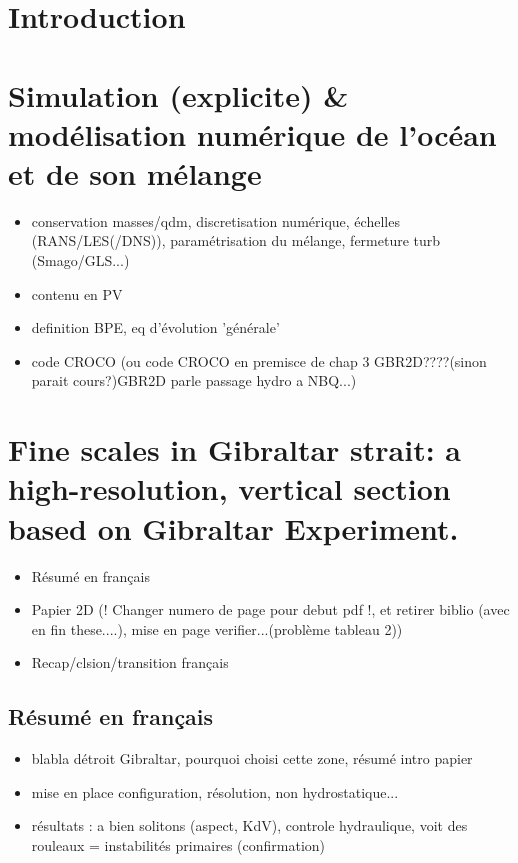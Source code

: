 \documentclass[a4paper,12pt,notitlepage,twoside]{report}
\numberwithin{equation}{section}
\begin{document}

\newpage
\chapter{Introduction}
\label{chapINTRO}
\citet{armi_1985}






\chapter{Simulation (explicite) \& modélisation numérique de l'oc\'ean et de son m\'elange}
\label{chap2}
\begin{itemize}
\item conservation masses/qdm, discretisation numérique, échelles (RANS/LES(/DNS)), paramétrisation du mélange, fermeture turb (Smago/GLS...)
\item contenu en PV
\item definition BPE, eq d'évolution 'générale'
\item code CROCO (ou code CROCO en premisce de chap 3 GBR2D????(sinon parait cours?)GBR2D parle passage hydro a NBQ...)
\end{itemize}








\chapter{Fine scales in Gibraltar strait: a high-resolution, vertical section based on Gibraltar Experiment.}
\label{chapGBR2D}
\begin{itemize}
\item R\'esum\'e en français
\item Papier 2D (! Changer numero de page pour debut pdf !, et retirer biblio (avec en fin these....), mise en page verifier...(problème tableau 2))
\item Recap/clsion/transition français
\end{itemize}

\section{Résumé en français}
\begin{itemize}
\item blabla détroit Gibraltar, pourquoi choisi cette zone, résumé intro papier
\item mise en place configuration, résolution, non hydrostatique...
\item résultats : a bien solitons (aspect, KdV), controle hydraulique, voit des rouleaux = instabilités primaires (confirmation)
\end{itemize}
\end{document}
